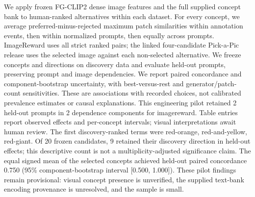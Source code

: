 We apply frozen FG-CLIP2 dense image features and the full supplied concept bank to human-ranked alternatives within each dataset. For every concept, we average preferred-minus-rejected maximum patch similarities within annotation events, then within normalized prompts, then equally across prompts. ImageReward uses all strict ranked pairs; the linked four-candidate Pick-a-Pic release uses the selected image against each non-selected alternative. We freeze concepts and directions on discovery data and evaluate held-out prompts, preserving prompt and image dependencies. We report paired concordance and component-bootstrap uncertainty, with best-versus-rest and generator/patch-count sensitivities. These are associations with recorded choices, not calibrated prevalence estimates or causal explanations. This engineering pilot retained 2 held-out prompts in 2 dependence components for imagereward. Table entries report observed effects and per-concept intervals; visual interpretations await human review.
The first discovery-ranked terms were red-orange, red-and-yellow, red-giant. Of 20 frozen candidates, 9 retained their discovery direction in held-out effects; this descriptive count is not a multiplicity-adjusted significance claim. The equal signed mean of the selected concepts achieved held-out paired concordance 0.750 (95\% component-bootstrap interval [0.500, 1.000]). These pilot findings remain provisional: visual concept presence is unverified, the supplied text-bank encoding provenance is unresolved, and the sample is small.
